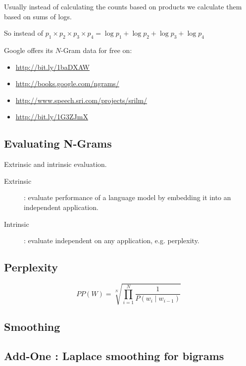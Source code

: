 Usually instead of calculating the counts based on products we calculate them based on sums of logs.

So instead of  $p_1 \times p_2 \times p_3 \times p_4 = \log p_1 + \log p_2 + \log p_3 + \log p_4$

Google offers its $N$-Gram data for free on:

\begin{itemize}
  \item \url{http://bit.ly/1baDXAW} %
  \item \url{http://books.google.com/ngrams/}
  \item	\url{http://www.speech.sri.com/projects/srilm/}
  \item	\url{http://bit.ly/1G3ZJmX} %
\end{itemize}


\subsection*{Evaluating N-Grams}

Extrinsic and intrinsic evaluation.

\begin{description}
  \item [Extrinsic]: evaluate performance of a language model by embedding it into an independent application.
  \item [Intrinsic]: evaluate independent on any application, e.g. perplexity.
\end{description}


\subsection*{Perplexity}

\begin{equation}
  PP(W) = \sqrt[N]{\prod_{i=1}^{N}\frac{1}{P(w_i \mid w_{i-1})}}
  \label{eq:ppw}
\end{equation}


\subsection*{Smoothing}


\subsection*{Add-One : Laplace smoothing  for bigrams}

